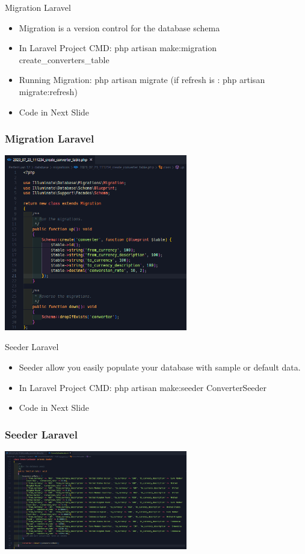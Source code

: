 \documentclass[aspectratio=169, table]{beamer}
\begin{document}
\begin{frame}{Migration Laravel}
    \vskip1cm
    \begin{itemize}
        \item Migration is a version control for the database schema
        \item In Laravel Project CMD: php artisan make:migration create\_converters\_table
        \item Running Migration: php artisan migrate (if refresh is : php artisan migrate:refresh)
        \item Code in Next Slide
    \end{itemize}
\end{frame}

\begin{frame}[fragile]
 \frametitle{Migration Laravel}
 \vskip1cm
 \begin{center}
  \includegraphics[width=0.6\textwidth]{classFiles/pertemuan-12-migrate.png}
 \end{center}
\end{frame}

\begin{frame}{Seeder Laravel}
    \vskip1cm
    \begin{itemize}
        \item Seeder allow you easily populate your database with sample or default data.
        \item In Laravel Project CMD: php artisan make:seeder ConverterSeeder
        \item Code in Next Slide
    \end{itemize}
\end{frame}

\begin{frame}[fragile]
 \frametitle{Seeder Laravel}
 \vskip1cm
 \begin{center}
  \includegraphics[width=0.6\textwidth]{classFiles/pertemuan-12-seeder.png}
 \end{center}
\end{frame}
\end{document}
